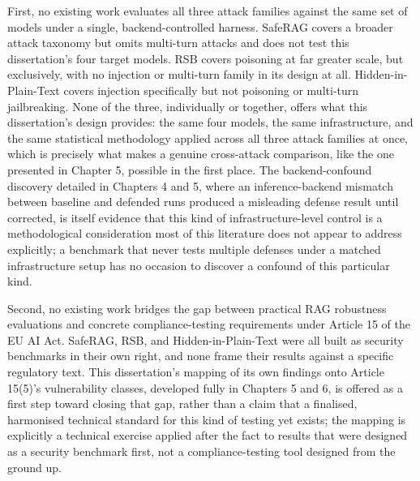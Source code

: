 First, no existing work evaluates all three attack families against the
same set of models under a single, backend-controlled harness. SafeRAG
\citep{liang2025saferag} covers a broader attack taxonomy but omits
multi-turn attacks and does not test this dissertation's four target
models. RSB \citep{zhang2025rsb} covers poisoning at far greater scale,
but exclusively, with no injection or multi-turn family in its design at
all. Hidden-in-Plain-Text \citep{guo2026hidden} covers injection
specifically but not poisoning or multi-turn jailbreaking. None of the
three, individually or together, offers what this dissertation's design
provides: the same four models, the same infrastructure, and the same
statistical methodology applied across all three attack families at
once, which is precisely what makes a genuine cross-attack comparison,
like the one presented in Chapter 5, possible in the first place. The
backend-confound discovery detailed in Chapters 4 and 5, where an
inference-backend mismatch between baseline and defended runs produced a
misleading defense result until corrected, is itself evidence that this
kind of infrastructure-level control is a methodological consideration
most of this literature does not appear to address explicitly; a
benchmark that never tests multiple defenses under a matched
infrastructure setup has no occasion to discover a confound of this
particular kind.

Second, no existing work bridges the gap between practical RAG
robustness evaluations and concrete compliance-testing requirements
under Article 15 of the EU AI Act. SafeRAG, RSB, and Hidden-in-Plain-Text
were all built as security benchmarks in their own right, and none frame
their results against a specific regulatory text. This dissertation's
mapping of its own findings onto Article 15(5)'s vulnerability classes,
developed fully in Chapters 5 and 6, is offered as a first step toward
closing that gap, rather than a claim that a finalised, harmonised
technical standard for this kind of testing yet exists; the mapping is
explicitly a technical exercise applied after the fact to results that
were designed as a security benchmark first, not a compliance-testing
tool designed from the ground up.

